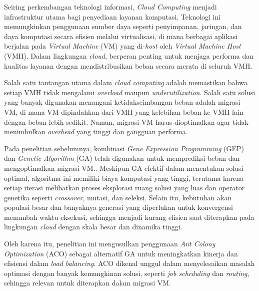 Seiring perkembangan teknologi informasi, \textit{Cloud Computing} menjadi infrastruktur utama bagi penyediaan layanan komputasi. Teknologi ini memungkinkan penggunaan sumber daya seperti penyimpanan, jaringan, dan daya komputasi secara efisien melalui virtualisasi, di mana berbagai aplikasi berjalan pada \textit{Virtual Machine} (VM) yang di-\textit{host} oleh \textit{Virtual Machine Host} (VMH). Dalam lingkungan \textit{cloud},  berperan penting untuk menjaga performa dan kualitas layanan dengan mendistribusikan beban secara merata di seluruh VMH.

Salah satu tantangan utama dalam \textit{cloud computing} adalah memastikan bahwa setiap VMH tidak mengalami \textit{overload} maupun \textit{underutilization}. Salah satu solusi yang banyak digunakan menangani ketidakseimbangan beban adalah migrasi VM, di mana VM dipindahkan dari VMH yang kelebihan beban ke VMH lain dengan beban lebih sedikit. Namun, migrasi VM  harus dioptimalkan agar tidak menimbulkan \textit{overhead} yang tinggi dan gangguan performa.

Pada penelitian sebelumnya, kombinasi \textit{Gene Expression Programming} (GEP) dan \textit{Genetic Algorithm} (GA) telah digunakan untuk memprediksi beban dan mengoptimalkan migrasi VM.\cite{1}. Meskipun GA efektif dalam menentukan solusi optimal, algoritma ini memiliki biaya komputasi yang tinggi, terutama karena setiap iterasi melibatkan proses eksplorasi ruang solusi yang luas dan operator genetika seperti \textit{crossover}, mutasi, dan seleksi. Selain itu, kebutuhan akan populasi besar dan banyaknya generasi yang diperlukan untuk konvergensi menambah waktu eksekusi, sehingga menjadi kurang efisien saat diterapkan pada lingkungan \textit{cloud} dengan skala besar dan dinamika tinggi. 

Oleh karena itu, penelitian ini mengusulkan penggunaan \textit{Ant Colony Optimization} (ACO) sebagai alternatif GA untuk meningkatkan kinerja dan efisiensi dalam \textit{load balancing}. ACO dikenal unggul dalam menyelesaikan masalah optimasi dengan banyak kemungkinan solusi, seperti \textit{job scheduling} dan \textit{routing}, sehingga relevan untuk diterapkan dalam migrasi VM.
